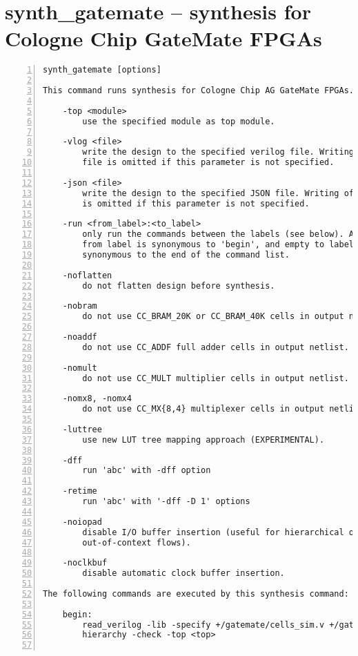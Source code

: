 \section{synth\_gatemate -- synthesis for Cologne Chip GateMate FPGAs}
\label{cmd:synth_gatemate}
\begin{lstlisting}[numbers=left,frame=single]
    synth_gatemate [options]

This command runs synthesis for Cologne Chip AG GateMate FPGAs.

    -top <module>
        use the specified module as top module.

    -vlog <file>
        write the design to the specified verilog file. Writing of an output
        file is omitted if this parameter is not specified.

    -json <file>
        write the design to the specified JSON file. Writing of an output file
        is omitted if this parameter is not specified.

    -run <from_label>:<to_label>
        only run the commands between the labels (see below). An empty
        from label is synonymous to 'begin', and empty to label is
        synonymous to the end of the command list.

    -noflatten
        do not flatten design before synthesis.

    -nobram
        do not use CC_BRAM_20K or CC_BRAM_40K cells in output netlist.

    -noaddf
        do not use CC_ADDF full adder cells in output netlist.

    -nomult
        do not use CC_MULT multiplier cells in output netlist.

    -nomx8, -nomx4
        do not use CC_MX{8,4} multiplexer cells in output netlist.

    -luttree
        use new LUT tree mapping approach (EXPERIMENTAL).

    -dff
        run 'abc' with -dff option

    -retime
        run 'abc' with '-dff -D 1' options

    -noiopad
        disable I/O buffer insertion (useful for hierarchical or 
        out-of-context flows).

    -noclkbuf
        disable automatic clock buffer insertion.

The following commands are executed by this synthesis command:

    begin:
        read_verilog -lib -specify +/gatemate/cells_sim.v +/gatemate/cells_bb.v
        hierarchy -check -top <top>


\end{lstlisting}
